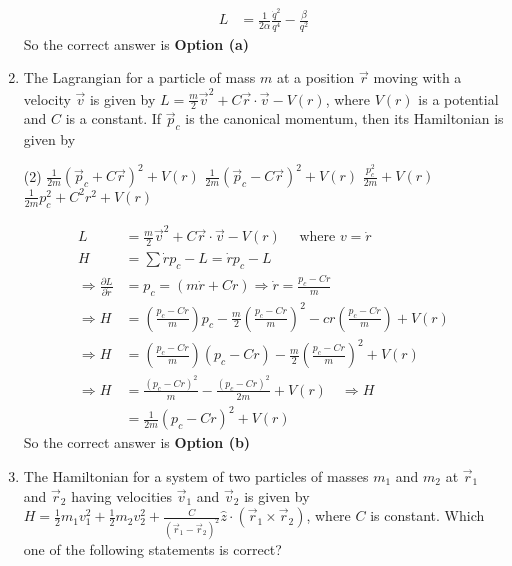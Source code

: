 \begin{enumerate}
\begin{answer}
\begin{align*}
	L&=\frac{1}{2 \alpha} \frac{\dot{q}^{2}}{q^{4}}-\frac{\beta}{q^{2}}
	\end{align*}
	So the correct answer is \textbf{Option (a)}
\end{answer}
	\item  The Lagrangian for a particle of mass $m$ at a position $\vec{r}$ moving with a velocity $\vec{v}$ is given by $L=\frac{m}{2} \vec{v}^{2}+C \vec{r} \cdot \vec{v}-V(r)$, where $V(r)$ is a potential and $C$ is a constant. If $\vec{p}_{c}$ is the canonical momentum, then its Hamiltonian is given by
	{}
	\begin{tasks}(2)
		\task[\textbf{a.}]$\frac{1}{2 m}\left(\vec{p}_{c}+C \vec{r}\right)^{2}+V(r)$
		\task[\textbf{b.}]$\frac{1}{2 m}\left(\vec{p}_{c}-C \vec{r}\right)^{2}+V(r)$
		\task[\textbf{c.}]$\frac{p_{c}^{2}}{2 m}+V(r)$
		\task[\textbf{d.}]  $\frac{1}{2 m} p_{c}^{2}+C^{2} r^{2}+V(r)$
	\end{tasks}
\begin{answer}
	\begin{align*}
	L&=\frac{m}{2} \vec{v}^{2}+C \vec{r} \cdot \vec{v}-V(r) \quad\text{ where }v=\dot{r}\\
	H&=\sum \dot{r} p_{c}-L=\dot{r} p_{c}-L\\
	\Rightarrow \frac{\partial L}{\partial \dot{r}}&=p_{c}=(m \dot{r}+C r) \Rightarrow \dot{r}=\frac{p_{c}-C r}{m}\\
	\Rightarrow H&=\left(\frac{p_{c}-C r}{m}\right) p_{c}-\frac{m}{2}\left(\frac{p_{c}-C r}{m}\right)^{2}-c r\left(\frac{p_{c}-C r}{m}\right)+V(r)\\
	\Rightarrow H&=\left(\frac{p_{c}-C r}{m}\right)\left(p_{c}-C r\right)-\frac{m}{2}\left(\frac{p_{c}-C r}{m}\right)^{2}+V(r)\\
	\Rightarrow H&=\frac{\left(p_{c}-C r\right)^{2}}{m}-\frac{\left(p_{c}-C r\right)^{2}}{2 m}+V(r) \quad \Rightarrow H\\&=\frac{1}{2 m}\left(p_{c}-C r\right)^{2}+V(r)
	\end{align*}
	So the correct answer is \textbf{Option (b)}
\end{answer}
	\item  The Hamiltonian for a system of two particles of masses $m_{1}$ and $m_{2}$ at $\vec{r}_{1}$ and $\vec{r}_{2}$ having velocities $\vec{v}_{1}$ and $\vec{v}_{2}$ is given by $H=\frac{1}{2} m_{1} v_{1}^{2}+\frac{1}{2} m_{2} v_{2}^{2}+\frac{C}{\left(\vec{r}_{1}-\vec{r}_{2}\right)^{2}} \hat{z} \cdot\left(\vec{r}_{1} \times \vec{r}_{2}\right)$, where $C$ is constant. Which one of the following statements is correct?

\end{enumerate}
